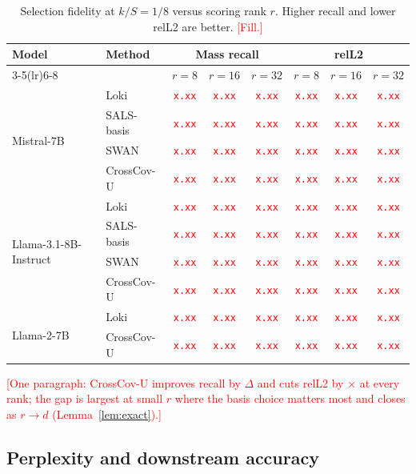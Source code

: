\documentclass[10pt]{article}
\newcommand{\TODO}[1]{\textcolor{red}{[#1]}}
\newcommand{\NUM}{\textcolor{red}{\texttt{x.xx}}}
\newcommand{\method}{CrossCov-U}
\theoremstyle{plain}
\theoremstyle{definition}
\theoremstyle{remark}
\begin{document}
\begin{table}[t]
\centering
\caption{Selection fidelity at $k/S=1/8$ versus scoring rank $r$. Higher recall and lower relL2 are better. \TODO{Fill.}}
\label{tab:fidelity}
\begin{tabular}{llcccccc}
\toprule
\multirow{2}{*}{Model} & \multirow{2}{*}{Method} & \multicolumn{3}{c}{Mass recall} & \multicolumn{3}{c}{relL2} \\
\cmidrule(lr){3-5}\cmidrule(lr){6-8}
 & & $r{=}8$ & $r{=}16$ & $r{=}32$ & $r{=}8$ & $r{=}16$ & $r{=}32$ \\
\midrule
\multirow{4}{*}{Mistral-7B}
 & Loki      & \NUM & \NUM & \NUM & \NUM & \NUM & \NUM \\
 & SALS-basis& \NUM & \NUM & \NUM & \NUM & \NUM & \NUM \\
 & SWAN      & \NUM & \NUM & \NUM & \NUM & \NUM & \NUM \\
 & \method{} & \NUM & \NUM & \NUM & \NUM & \NUM & \NUM \\
\midrule
\multirow{4}{*}{Llama-3.1-8B-Instruct}
 & Loki      & \NUM & \NUM & \NUM & \NUM & \NUM & \NUM \\
 & SALS-basis& \NUM & \NUM & \NUM & \NUM & \NUM & \NUM \\
 & SWAN      & \NUM & \NUM & \NUM & \NUM & \NUM & \NUM \\
 & \method{} & \NUM & \NUM & \NUM & \NUM & \NUM & \NUM \\
\midrule
\multirow{2}{*}{Llama-2-7B}
 & Loki      & \NUM & \NUM & \NUM & \NUM & \NUM & \NUM \\
 & \method{} & \NUM & \NUM & \NUM & \NUM & \NUM & \NUM \\
\bottomrule
\end{tabular}
\end{table}

\TODO{One paragraph: \method{} improves recall by $\Delta$ and cuts relL2 by
$\times$ at every rank; the gap is largest at small $r$ where the basis
choice matters most and closes as $r\to d$ (Lemma~\ref{lem:exact}).}

\subsection{Perplexity and downstream accuracy}
\end{document}

